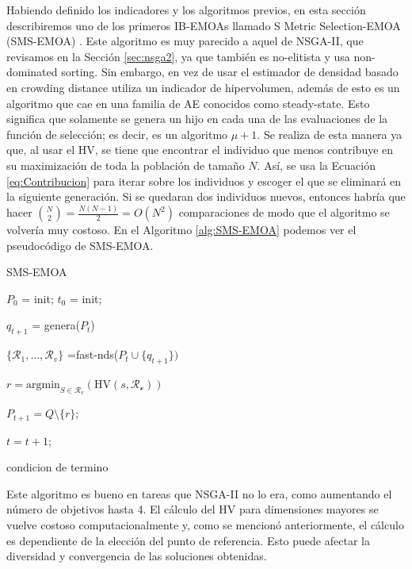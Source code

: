 Habiendo definido los indicadores y los algoritmos previos, en esta sección describiremos uno de los primeros IB-EMOAs llamado S Metric Selection-EMOA (SMS-EMOA) \cite{SMS-EMOA}. Este algoritmo es muy parecido a aquel de NSGA-II, que revisamos en la Sección \ref{sec:nsga2}, ya que también es no-elitista y usa non-dominated sorting. Sin embargo, en vez de usar el estimador de densidad basado en crowding distance utiliza un indicador de hipervolumen, además de esto es un algoritmo que cae en una familia de AE conocidos como steady-state. Esto significa que solamente se genera un hijo en cada una de las evaluaciones de la función de selección; es decir, es un algoritmo $\mu+1$. Se realiza de esta manera ya que, al usar el HV, se tiene que encontrar el individuo que menos contribuye en su maximización de toda la población de tamaño $N$. Así, se usa la Ecuación \eqref{eq:Contribucion} para iterar sobre los individuos y escoger el que se eliminará en la siguiente generación. Si se quedaran dos individuos nuevos, entonces habría que hacer $\binom{N}{2}=\frac{N(N-1)}{2}=O(N^2)$ comparaciones de modo que el algoritmo se volvería muy costoso. En el Algoritmo \ref{alg:SMS-EMOA} podemos ver el pseudocódigo de SMS-EMOA.

\begin{algorithm}
    \caption{SMS-EMOA}\label{alg:SMS-EMOA}
    \begin{algorithmic}[1] %
        \State $P_0$ = init;
        \State $t_0$ = init;

        \Repeat
        
        $q_{t+1}$ = genera($P_t$)
        
        $\{\mathcal{R}_1,\ldots,\mathcal{R}_v\}$ =fast-nds($P_t \cup \{q_{t+1}\})$
        
        $r=\text{argmin}_{S\in \mathcal{R}_v}\left( \text{HV}(s,\mathcal{R_v}) \right)$
        
        $P_{t+1}= Q \setminus \{r\}$;
        
        $t=t+1$;
        
        \Until condicion de termino

    \end{algorithmic}
\end{algorithm}

Este algoritmo es bueno en tareas que NSGA-II no lo era, como aumentando el número de objetivos hasta 4. El cálculo del HV para dimensiones mayores se vuelve costoso computacionalmente y, como se mencionó anteriormente, el cálculo es dependiente de la elección del punto de referencia. Esto puede afectar la diversidad y convergencia de las soluciones obtenidas.


